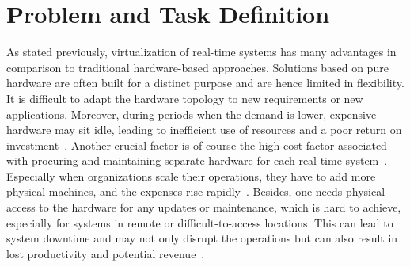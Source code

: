 \documentclass[MMR,Master,english]{twbook}
\begin{document}
\section{Problem and Task Definition}
As stated previously, virtualization of real-time systems has many advantages in comparison to traditional hardware-based approaches. Solutions based on pure hardware are often built for a distinct purpose and are hence limited in flexibility. It is difficult to adapt the hardware topology to new requirements or new applications. Moreover, during periods when the demand is lower, expensive hardware may sit idle, leading to inefficient use of resources and a poor return on investment~\cite{gabrielResourceAwareParameterTuning2019}. Another crucial factor is of course the high cost factor associated with procuring and maintaining separate hardware for each real-time system~\cite{bhardwajVirtualizationCloudComputing2021}. Especially when organizations scale their operations, they have to add more physical machines, and the expenses rise rapidly~\cite{abbasiExploringOpenStackScalable2023}. Besides, one needs physical access to the hardware for any updates or maintenance, which is hard to achieve, especially for systems in remote or difficult-to-access locations. This can lead to system downtime and may not only disrupt the operations but can also result in lost productivity and potential revenue~\cite{mahfoudRealTimePredictiveMaintenanceBased2024}.
\end{document}
